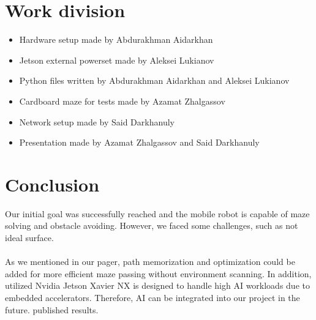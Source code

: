 \documentclass[]{IEEEphot}
\begin{document}
\section{Work division}

\begin{itemize}
    \item Hardware setup made by Abdurakhman Aidarkhan
    \item Jetson external powerset made by Aleksei Lukianov
    \item Python files written by Abdurakhman Aidarkhan and Aleksei Lukianov
    \item Cardboard maze for tests made by Azamat Zhalgassov
    \item Network setup made by Said Darkhanuly
    \item Presentation made by Azamat Zhalgassov and Said Darkhanuly
\end{itemize}

\section{Conclusion}
 Our initial goal was successfully reached and the mobile robot is capable of maze solving and obstacle avoiding. However, we faced some challenges, such as not ideal surface.
\\\\
As we mentioned in our pager, path memorization and optimization could be added for more efficient maze passing without environment scanning. In addition, utilized Nvidia Jetson Xavier NX is designed to handle high AI workloads due to embedded accelerators. Therefore, AI can be integrated into our project in the future.
published results.     



\end{document}
